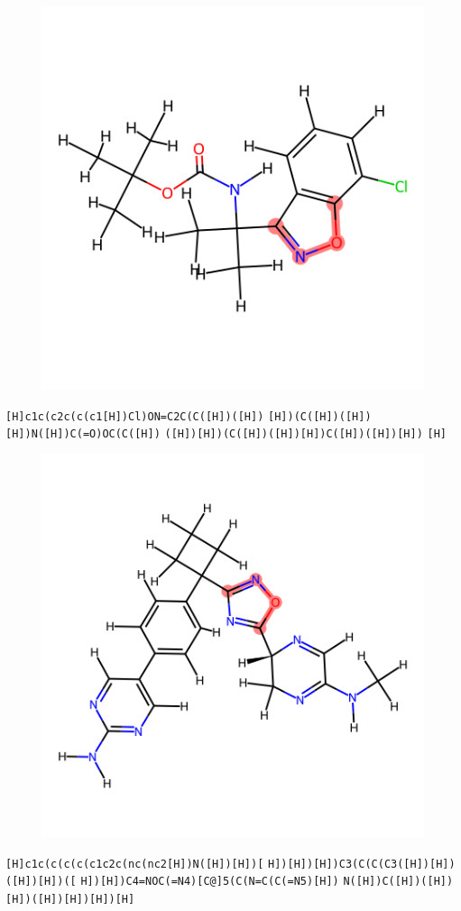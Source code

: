 \documentclass{article}
\begin{document}
\begin{figure}[ht]
\centering
    \includegraphics{mol108.png}
\end{figure}
\verb|[H]c1c(c2c(c(c1[H])Cl)ON=C2C(C([H])([H])| \verb|[H])(C([H])([H])[H])N([H])C(=O)OC(C([H])| \verb|([H])[H])(C([H])([H])[H])C([H])([H])[H])| \verb|[H]|

\begin{figure}[ht]
\centering
    \includegraphics{mol109.png}
\end{figure}
\verb|[H]c1c(c(c(c(c1c2c(nc(nc2[H])N([H])[H])[| \verb|H])[H])[H])C3(C(C(C3([H])[H])([H])[H])([| \verb|H])[H])C4=NOC(=N4)[C@]5(C(N=C(C(=N5)[H])| \verb|N([H])C([H])([H])[H])([H])[H])[H])[H]|
\end{document}
